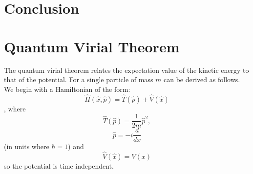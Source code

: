 \documentclass[12pt]{article}
\begin{document}
\section{Conclusion}






\appendix
    \section{Quantum Virial Theorem}
        \label{ap:Quantum Virial Theorem}
        The quantum virial theorem relates the expectation value of the kinetic energy to that of the potential. For a single particle of mass $m$ can be derived as follows. We begin with a Hamiltonian of the form:
        \begin{equation}
            \label{eq:VirialHamiltonian}
            \hat{H}\left(\hat{x},\hat{p}\right) = \hat{T}\left(\hat{p}\right)+\hat{V}\left(\hat{x}\right)  
        \end{equation},
        where
        \begin{equation}
            \label{eq:VirialKinetic}
            \hat{T}\left(\hat{p}\right) = \frac{1}{2m}\hat{p}^2,
        \end{equation}
        \begin{equation}
            \label{eq:VirialMomentumOperator}
            \hat{p} = -i\frac{d}{dx}
        \end{equation}
        (in units where $\hbar=1$) and
        \begin{equation}
            \label{eq:VirialPotentialOperator} \hat{V}\left(\hat{x}\right) = V\left(x\right)
        \end{equation}
        so the potential is time independent.
\end{document}
